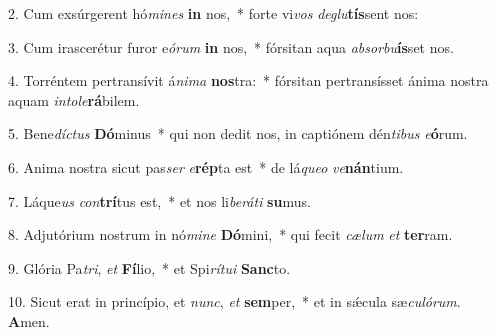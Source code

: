 2. Cum exsúrgerent hó\textit{mi}\textit{nes} \textbf{in} nos,~*  forte vi\textit{vos} \textit{de}\textit{glu}\textbf{tís}sent nos:\

3. Cum irascerétur furor e\textit{ó}\textit{rum} \textbf{in} nos,~*  fórsitan aqua \textit{ab}\textit{sor}\textit{bu}\textbf{ís}set nos.\

4. Torréntem pertransívit á\textit{ni}\textit{ma} \textbf{nos}tra:~*  fórsitan pertransísset ánima nostra aquam \textit{in}\textit{to}\textit{le}\textbf{rá}bilem.\

5. Bene\textit{díc}\textit{tus} \textbf{Dó}minus~*  qui non dedit nos, in captiónem dén\textit{ti}\textit{bus} \textit{e}\textbf{ó}rum.\

6. Anima nostra sicut pas\textit{ser} \textit{e}\textbf{rép}ta est~*  de lá\textit{que}\textit{o} \textit{ve}\textbf{nán}tium.\

7. Láque\textit{us} \textit{con}\textbf{trí}tus est,~*  et nos li\textit{be}\textit{rá}\textit{ti} \textbf{su}mus.\

8. Adjutórium nostrum in nó\textit{mi}\textit{ne} \textbf{Dó}mini,~*  qui fecit \textit{cæ}\textit{lum} \textit{et} \textbf{ter}ram.\

9. Glória Pa\textit{tri}, \textit{et} \textbf{Fí}lio,~*  et Spi\textit{rí}\textit{tu}\textit{i} \textbf{Sanc}to.\

10. Sicut erat in princípio, et \textit{nunc}, \textit{et} \textbf{sem}per,~*  et in sǽcula sæ\textit{cu}\textit{ló}\textit{rum}. \textbf{A}men.\

